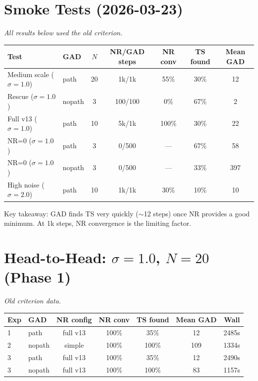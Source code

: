 \documentclass[11pt,a4paper]{article}
\begin{document}
\section{Smoke Tests (2026-03-23)}
\label{app:smoke}

\textit{All results below used the old criterion.}

\begin{center}
\begin{tabular}{llccccc}
\toprule
Test & GAD & $N$ & NR/GAD steps & NR conv & TS found & Mean GAD \\
\midrule
Medium scale ($\sigma=1.0$) & path   & 20 & 1k/1k & 55\% & 30\% & 12 \\
Rescue ($\sigma=1.0$)       & nopath & 3  & 100/100 & 0\%  & 67\% & 2 \\
Full v13 ($\sigma=1.0$)     & path   & 10 & 5k/1k & 100\% & 30\% & 22 \\
NR=0 ($\sigma=1.0$)         & path   & 3  & 0/500 & ---  & 67\% & 58 \\
NR=0 ($\sigma=1.0$)         & nopath & 3  & 0/500 & ---  & 33\% & 397 \\
High noise ($\sigma=2.0$)   & path   & 10 & 1k/1k & 30\% & 10\% & 10 \\
\bottomrule
\end{tabular}
\end{center}

Key takeaway: GAD finds TS very quickly ($\sim$12 steps) once NR provides a
good minimum.  At 1k steps, NR convergence is the limiting factor.

\section{Head-to-Head: $\sigma = 1.0$, $N = 20$ (Phase 1)}
\label{app:phase1}

\textit{Old criterion data.}

\begin{center}
\begin{tabular}{llccccc}
\toprule
Exp & GAD & NR config & NR conv & TS found & Mean GAD & Wall \\
\midrule
1 & path   & full v13 & 100\% & 35\% & 12  & 2485s \\
2 & nopath & simple   & 100\% & 100\% & 109 & 1334s \\
3 & path   & full v13 & 100\% & 35\% & 12  & 2490s \\
3 & nopath & full v13 & 100\% & 100\% & 83  & 1157s \\
\bottomrule
\end{tabular}
\end{center}
\end{document}
